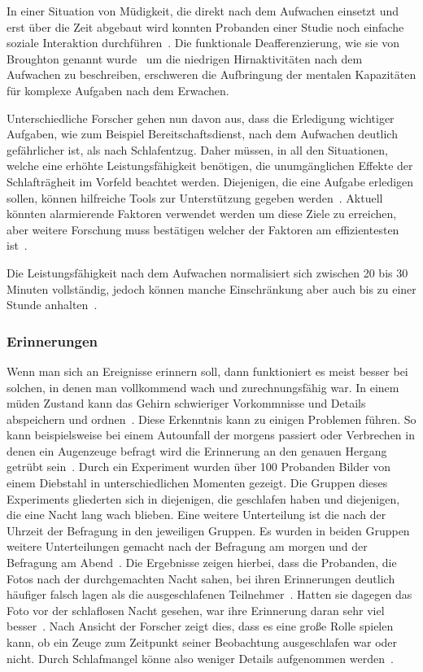 In einer Situation von Müdigkeit, die direkt nach dem Aufwachen einsetzt und erst über die Zeit abgebaut wird konnten Probanden einer Studie noch einfache soziale Interaktion durchführen~\cite{dinges1990you}. 
Die funktionale Deafferenzierung, wie sie von Broughton genannt wurde~\cite{broughton1968sleep} um die niedrigen Hirnaktivitäten nach dem Aufwachen zu beschreiben, erschweren die Aufbringung der mentalen Kapazitäten für komplexe Aufgaben nach dem Erwachen.

Unterschiedliche Forscher gehen nun davon aus, dass die Erledigung wichtiger Aufgaben, wie zum Beispiel Bereitschaftsdienst, nach dem Aufwachen deutlich gefährlicher ist, als nach Schlafentzug.
Daher müssen, in all den Situationen, welche eine erhöhte Leistungsfähigkeit benötigen, die unumgänglichen Effekte der Schlafträgheit im Vorfeld beachtet werden. 
Diejenigen, die eine Aufgabe erledigen sollen, können hilfreiche Tools zur Unterstützung gegeben werden~\cite{ferrara2000sleep}. 
Aktuell könnten alarmierende Faktoren verwendet werden um diese Ziele zu erreichen, aber weitere Forschung muss bestätigen welcher der Faktoren am effizientesten ist~\cite{ferrara2000sleep}.

Die Leistungsfähigkeit nach dem Aufwachen normalisiert sich zwischen 20 bis 30 Minuten vollständig, jedoch können manche Einschränkung aber auch bis zu einer Stunde anhalten~\cite{online:muedesGehirn}.

\subsubsection{Erinnerungen}

Wenn man sich an Ereignisse erinnern soll, dann funktioniert es meist besser bei solchen, in denen man vollkommend wach und zurechnungsfähig war. In einem müden Zustand kann das Gehirn schwieriger Vorkommnisse und Details abspeichern und ordnen~\cite{online:streiche}. 
Diese Erkenntnis kann zu einigen Problemen führen. So kann beispielsweise bei einem Autounfall der morgens passiert oder Verbrechen in denen ein Augenzeuge befragt wird die Erinnerung an den genauen Hergang getrübt sein~\cite{online:streiche}. 
Durch ein Experiment wurden über 100 Probanden Bilder von einem Diebstahl in unterschiedlichen Momenten gezeigt. 
Die Gruppen dieses Experiments gliederten sich in diejenigen, die geschlafen haben und diejenigen, die eine Nacht lang wach blieben. Eine weitere Unterteilung ist die nach der Uhrzeit der Befragung in den jeweiligen Gruppen. Es wurden in beiden Gruppen weitere Unterteilungen gemacht nach der Befragung am morgen und der Befragung am Abend~\cite{online:streiche}. 
Die Ergebnisse zeigen hierbei, dass die Probanden, die Fotos nach der durchgemachten Nacht sahen, bei ihren Erinnerungen deutlich häufiger falsch lagen als die ausgeschlafenen Teilnehmer~\cite{online:streiche}.
Hatten sie dagegen das Foto vor der schlaflosen Nacht gesehen, war ihre Erinnerung daran sehr viel besser~\cite{online:streiche}. 
Nach Ansicht der Forscher zeigt dies, dass es eine große Rolle spielen kann, ob ein Zeuge zum Zeitpunkt seiner Beobachtung ausgeschlafen war oder nicht. Durch Schlafmangel könne also weniger Details aufgenommen werden~\cite{online:streiche}.
